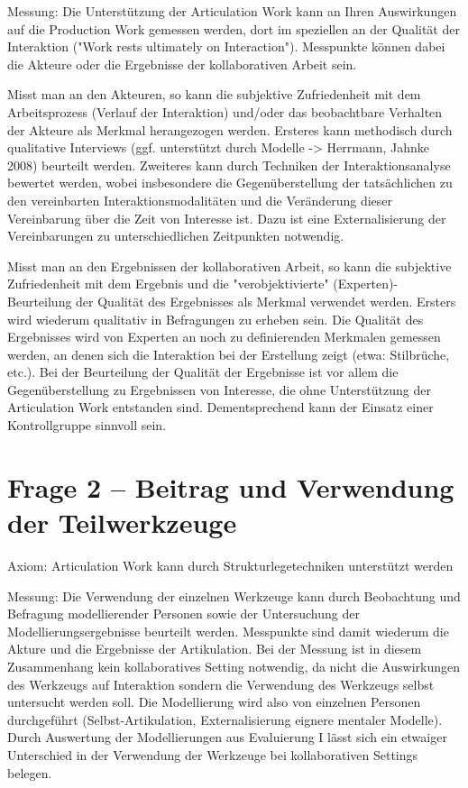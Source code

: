 Messung:
Die Unterstützung der Articulation Work kann an Ihren Auswirkungen auf die Production Work gemessen werden, dort im speziellen an der Qualität der Interaktion ("Work rests ultimately on Interaction"). Messpunkte können dabei die Akteure oder die Ergebnisse der kollaborativen Arbeit sein.

Misst man an den Akteuren, so kann die subjektive Zufriedenheit mit dem Arbeitsprozess (Verlauf der Interaktion) und/oder das beobachtbare Verhalten der Akteure als Merkmal herangezogen werden. Ersteres kann methodisch durch qualitative Interviews (ggf. unterstützt durch Modelle -> Herrmann, Jahnke 2008) beurteilt werden. Zweiteres kann durch Techniken der Interaktionsanalyse bewertet werden, wobei insbesondere die Gegenüberstellung der tatsächlichen zu den vereinbarten Interaktionsmodalitäten und die Veränderung dieser Vereinbarung über die Zeit von Interesse ist. Dazu ist eine Externalisierung der Vereinbarungen zu unterschiedlichen Zeitpunkten notwendig. 

Misst man an den Ergebnissen der kollaborativen Arbeit, so kann die subjektive Zufriedenheit mit dem Ergebnis und die "verobjektivierte" (Experten)-Beurteilung der Qualität des Ergebnisses als Merkmal verwendet werden. Ersters wird wiederum qualitativ in Befragungen zu erheben sein. Die Qualität des Ergebnisses wird von Experten an noch zu definierenden Merkmalen gemessen werden, an denen sich die Interaktion bei der Erstellung zeigt (etwa: Stilbrüche, etc.). Bei der Beurteilung der Qualität der Ergebnisse ist vor allem die Gegenüberstellung zu Ergebnissen von Interesse, die ohne Unterstützung der Articulation Work entstanden sind. Dementsprechend kann der Einsatz einer Kontrollgruppe sinnvoll sein.

\section{Frage 2 – Beitrag und Verwendung der Teilwerkzeuge} %
\label{sec:frage_2_beitrag_und_verwendung_der_teilwerkzeuge}

Axiom: Articulation Work kann durch Strukturlegetechniken unterstützt werden

Messung:
Die Verwendung der einzelnen Werkzeuge kann durch Beobachtung und Befragung modellierender Personen sowie der Untersuchung der Modellierungsergebnisse beurteilt werden. Messpunkte sind damit wiederum die Akture und die Ergebnisse der Artikulation. Bei der Messung ist in diesem Zusammenhang kein kollaboratives Setting notwendig, da nicht die Auswirkungen des Werkzeugs auf Interaktion sondern die Verwendung des Werkzeugs selbst untersucht werden soll. Die Modellierung wird also von einzelnen Personen durchgeführt (Selbst-Artikulation, Externalisierung eignere mentaler Modelle). Durch Auswertung der Modellierungen aus Evaluierung I lässt sich ein etwaiger Unterschied in der Verwendung der Werkzeuge bei kollaborativen Settings belegen.

